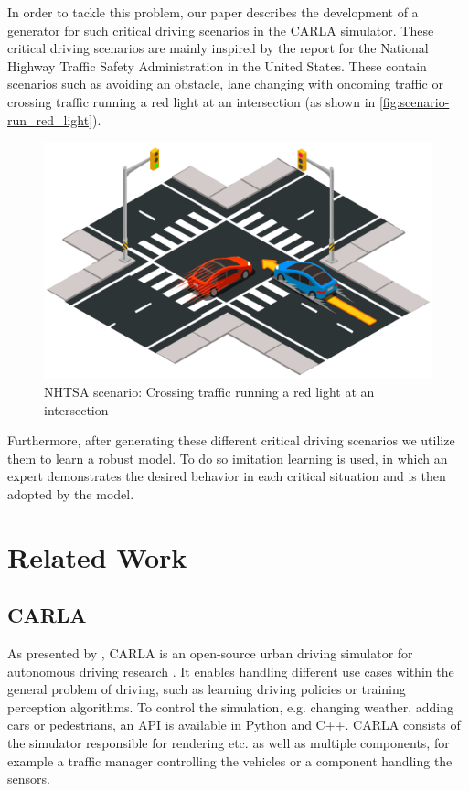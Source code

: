 \documentclass[conference, 11pt]{IEEEtran}
\begin{document}
In order to tackle this problem, our paper describes the development of a generator for such critical driving scenarios in the CARLA simulator.
These critical driving scenarios are mainly inspired by the report  \cite{NHTSA:PreCrashScenarios} for the National Highway Traffic Safety Administration in the United States.
These contain scenarios such as avoiding an obstacle, lane changing with oncoming traffic or crossing traffic running a red light at an intersection (as shown in \autoref{fig:scenario-run_red_light}).

\begin{figure}[ht]
    \centering
    \includegraphics[width=0.7\linewidth]{figures/scenario-run_red_light.png}
    \caption{NHTSA scenario: Crossing traffic running a red light at an intersection \cite{CARLAChallenge:Scenarios}}
    \label{fig:scenario-run_red_light}
\end{figure}

Furthermore, after generating these different critical driving scenarios we utilize them to learn a robust model.
To do so imitation learning is used, in which an expert demonstrates the desired behavior in each critical situation and is then adopted by the model.

\section{Related Work}

\subsection{CARLA}
As presented by \citeauthor{Dosovitskiy17:CARLA}, CARLA is an open-source urban driving simulator for autonomous driving research \cite{Dosovitskiy17:CARLA}.
It enables handling different use cases within the general problem of driving, such as learning driving policies or training perception algorithms.
To control the simulation, e.g. changing weather, adding cars or pedestrians, an API is available in Python and C++.
CARLA consists of the simulator responsible for rendering etc. as well as multiple components, for example a traffic manager controlling the vehicles or a component handling the sensors.
\end{document}
